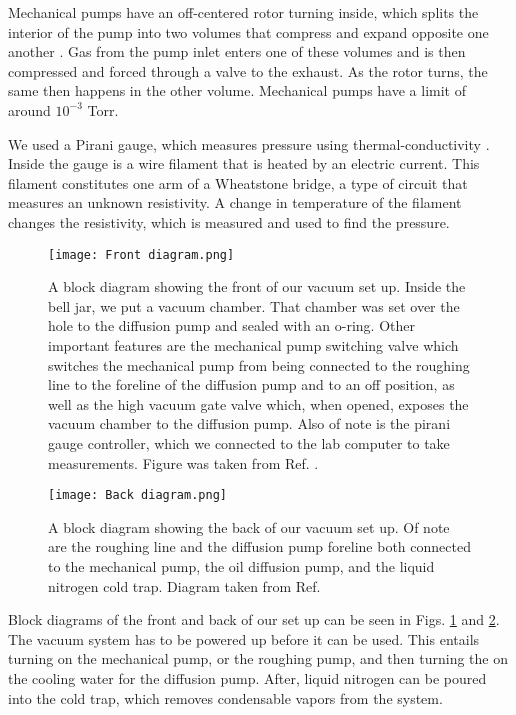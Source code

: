 \documentclass[11pt,letterpaper]{article}
\begin{document}
Mechanical pumps have an off-centered rotor turning inside, which splits the interior of the pump into two volumes that compress and expand opposite one another \cite{Moore}. Gas from the pump inlet enters one of these volumes and is then compressed and forced through a valve to the exhaust. As the rotor turns, the same then happens in the other volume. Mechanical pumps have a limit of around $10^{-3}$ Torr.

We used a Pirani gauge, which measures pressure using thermal-conductivity \cite{Moore}. Inside the gauge is a wire filament that is heated by an electric current. This filament constitutes one arm of a Wheatstone bridge, a type of circuit that measures an unknown resistivity. A change in temperature of the filament changes the resistivity, which is measured and used to find the pressure.


\begin{figure}
\centerline{\texttt{[image: Front diagram.png]}}
\caption{A block diagram showing the front of our vacuum set up. Inside the bell jar, we put a vacuum chamber. That chamber was set over the hole to the diffusion pump and sealed with an o-ring. Other important features are the mechanical pump switching valve which switches the mechanical pump from being connected to the roughing line to the foreline of the diffusion pump and to an off position, as well as the high vacuum gate valve which, when opened, exposes the vacuum chamber to the diffusion pump. Also of note is the pirani gauge controller, which we connected to the lab computer to take measurements. Figure was taken from Ref. \cite{Cooke}.} \label{Front diagram}
\end{figure}

\begin{figure}
\centerline{\texttt{[image: Back diagram.png]}}
\caption{A block diagram showing the back of our vacuum set up. Of note are the roughing line and the diffusion pump foreline both connected to the mechanical pump, the oil diffusion pump, and the liquid nitrogen cold trap. Diagram taken from Ref. \cite{Cooke}} \label{Back diagram}
\end{figure}

Block diagrams of the front and back of our set up can be seen in Figs. \ref{Front diagram} and \ref{Back diagram}. The vacuum system has to be powered up before it can be used. This entails turning on the mechanical pump, or the roughing pump, and then turning the on the cooling water for the diffusion pump. After, liquid nitrogen can be poured into the cold trap, which removes condensable vapors from the system. 
\end{document}
